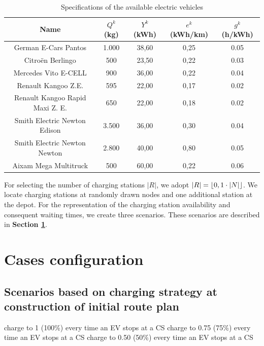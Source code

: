 \documentclass[11pt]{article}
\DeclarePairedDelimiter\floor{\lfloor}{\rfloor}
\begin{document}
\begin{table}[H]
	\begin{center}
	\begin{tabular}{c c c c c}
	\toprule
	Name & $Q^k$ (kg) &  $Y^k$ (kWh) & $e^k$ (kWh/km) & $g^k$ (h/kWh)\\ \midrule
	German E-Cars Pantos & 1.000 & 38,60  & 0,25 & 0.05\\
	Citro\"{e}n Berlingo &500 &23,50 &0,22 & 0.03 \\
	Mercedes Vito E-CELL & 900 & 36,00& 0,22 & 0.04\\
	Renault Kangoo Z.E. & 595 & 22,00 & 0,17 & 0.02 \\
	Renault Kangoo Rapid Maxi Z. E. & 650  & 22,00 & 0,18 & 0.02 \\
	Smith Electric Newton Edison & 3.500 & 36,00 & 0,30 & 0.04\\
	Smith Electric Newton Newton & 2.800 & 40,00 & 0,80 & 0.05 \\
	Aixam Mega Multitruck & 500 & 60,00 & 0,22 & 0.06\\
	\bottomrule
	\end{tabular}
	\end{center}
\caption{Specifications of the available electric vehicles}
\label{table:vehicles}
\end{table}

For selecting the number of charging stations $|R|$, we adopt $|R| = \floor{0,1 \cdot |N|}$. We locate charging stations at randomly drawn nodes and one additional station at the depot. For the representation of the charging station availability and consequent waiting times, we create three scenarios. These scenarios are described in \textbf{Section \ref{section:cases}}.

\section{Cases configuration}
\label{section:cases}
\subsection{Scenarios based on charging strategy at construction of initial route plan}
charge to 1 (100\%) every time an EV stops at a CS
charge to 0.75 (75\%) every time an EV stops at a CS
charge to 0.50 (50\%) every time an EV stops at a CS
\end{document}
